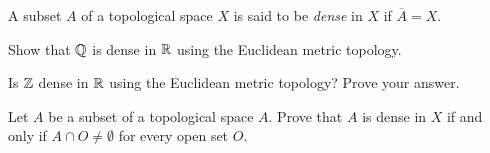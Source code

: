 \item A subset $A$ of a topological space $X$ is said to be \emph{dense} in $X$ if $\overline{A} = X$. 
	\ba
	\item Show that $\mathbb{Q}$ is dense in $\mathbb{R}$ using the Euclidean metric topology.
	
	\item Is $\mathbb{Z}$ dense in $\mathbb{R}$  using the Euclidean metric topology? Prove your answer.
	
	\item Let $A$ be a subset of a topological space $A$. Prove that $A$ is dense in $X$ if and only if $A \cap O \neq \emptyset$ for every open set $O$.
	
	\ea
	
\begin{comment}

\ExerciseSolution

	\ba
	\item Let $x$ be a real number and let $O$ be an open set containing $x$. There exists $\epsilon > 0$ such that $B(x, \epsilon) \subseteq O$. Then $y =x + \frac{\epsilon}{2} \in B(x,\epsilon)$. We know that there is a rational number between any two real numbers, so there is a rational number $r$ between $x$ and $y$. Since 
	\[d(x,y) = d(x,r) + d(r,y)\]
	we have that 
	\[d(x,r) = d(x,y) - d(r,y) < \epsilon.\]
	Thus, $r$ is a rational number in $O$ that is different from $x$. We conclude that $x \in \overline{\Q}$ and so $\overline{\Q} = \R$. 
	
	\item The subset $\Z$ is not dense in $\R$. The open set $B(0,1)$ contains no integers other than $0$, so $0 \notin \overline{\Z}$. 
	
	\item Let $A$ be a subset of a topological space $A$. Suppose $A$ is dense in $X$. Then every point in $A$ is a limit point of $A$. Let $O$ be an open set and let $x \in O$. Since $x$ is a limit point of $A$, $O$ must contain a point in $A$ different from $x$. It follows that $A \cap O \neq \emptyset$. 
	
Now assume that $A \cap O \neq \emptyset$ for every open set $O$. If $A = X$, then $\overline{A} = X$ and we are done. Suppose $A \neq X$ and let $x \in X \setminus A$. Let $O$ be an open set that contains $x$. Since $x \notin A$, the fact that $A \cap O \neq \emptyset$ implies that $O$ contains an element of $A$ different from $x$.  Thus, $x \in A'$. Therefore, $\overline{A} = A \cup A' = X$ and $A$ is dense in $X$. 
	
	\ea
	
\end{comment}

